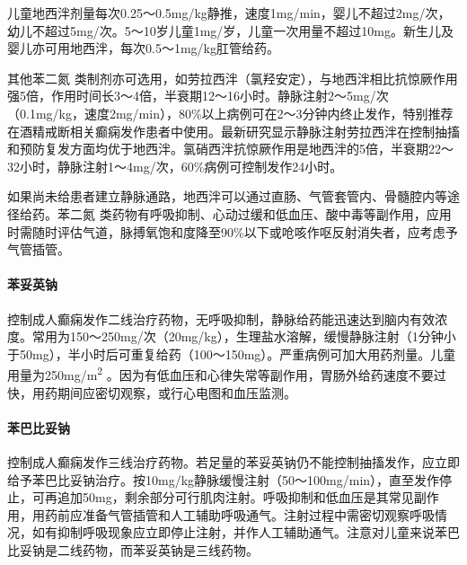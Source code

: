 儿童地西泮剂量每次0.25～0.5mg/kg静推，速度1mg/min，婴儿不超过2mg/次，幼儿不超过5mg/次。5～10岁儿童1mg/岁，儿童一次用量不超过10mg。新生儿及婴儿亦可用地西泮，每次0.5～1mg/kg肛管给药。

其他苯二氮{}
类制剂亦可选用，如劳拉西泮（氯羟安定），与地西泮相比抗惊厥作用强5倍，作用时间长3～4倍，半衰期12～16小时。静脉注射2～5mg/次（0.1mg/kg，速度2mg/min），80\%以上病例可在2～3分钟内终止发作，特别推荐在酒精戒断相关癫痫发作患者中使用。最新研究显示静脉注射劳拉西泮在控制抽搐和预防复发方面均优于地西泮。氯硝西泮抗惊厥作用是地西泮的5倍，半衰期22～32小时，静脉注射1～4mg/次，60\%病例可控制发作24小时。

如果尚未给患者建立静脉通路，地西泮可以通过直肠、气管套管内、骨髓腔内等途径给药。苯二氮{}
类药物有呼吸抑制、心动过缓和低血压、酸中毒等副作用，应用时需随时评估气道，脉搏氧饱和度降至90\%以下或呛咳作呕反射消失者，应考虑予气管插管。

\paragraph{苯妥英钠}

控制成人癫痫发作二线治疗药物，无呼吸抑制，静脉给药能迅速达到脑内有效浓度。常用为150～250mg/次（20mg/kg），生理盐水溶解，缓慢静脉注射（1分钟小于50mg），半小时后可重复给药（100～150mg）。严重病例可加大用药剂量。儿童用量为250mg/m\textsuperscript{2}
。因为有低血压和心律失常等副作用，胃肠外给药速度不要过快，用药期间应密切观察，或行心电图和血压监测。

\paragraph{苯巴比妥钠}

控制成人癫痫发作三线治疗药物。若足量的苯妥英钠仍不能控制抽搐发作，应立即给予苯巴比妥钠治疗。按10mg/kg静脉缓慢注射（50～100mg/min），直至发作停止，可再追加50mg，剩余部分可行肌肉注射。呼吸抑制和低血压是其常见副作用，用药前应准备气管插管和人工辅助呼吸通气。注射过程中需密切观察呼吸情况，如有抑制呼吸现象应立即停止注射，并作人工辅助通气。注意对儿童来说苯巴比妥钠是二线药物，而苯妥英钠是三线药物。

